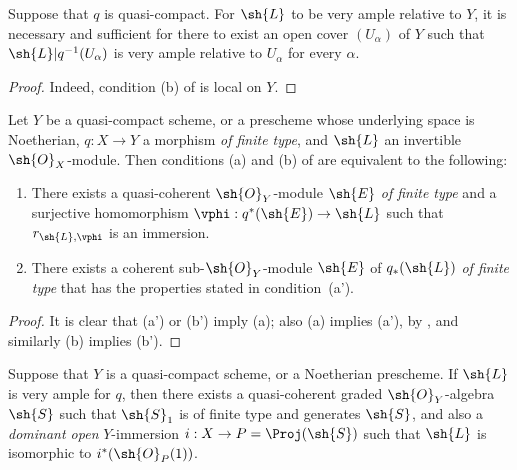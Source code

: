 \begin{corollary}[4.4.5]
\label{II.4.4.5}
Suppose that $q$ is quasi-compact.
For $\sh{L}$ to be very ample relative to $Y$, it is necessary and sufficient for there to exist an open cover $(U_\alpha)$ of $Y$ such that $\sh{L}|q^{-1}(U_\alpha)$ is very ample relative to $U_\alpha$ for every $\alpha$.
\end{corollary}

\begin{proof}
Indeed, condition (b) of  is local on $Y$.
\end{proof}

\begin{proposition}[4.4.6]
\label{II.4.4.6}
Let $Y$ be a quasi-compact scheme, or a prescheme whose underlying space is Noetherian, $q:X\to Y$ a morphism \emph{of finite type}, and $\sh{L}$ an invertible $\sh{O}_X$-module.
Then conditions (a) and (b) of  are equivalent to the following:
\begin{enumerate}
  \item[\rm{(a')}] There exists a quasi-coherent $\sh{O}_Y$-module $\sh{E}$ \emph{of finite type} and a surjective homomorphism $\vphi:q^*(\sh{E})\to\sh{L}$ such that $r_{\sh{L},\vphi}$ is an immersion.
  \item[\rm{(b')}] There exists a coherent sub-$\sh{O}_Y$-module $\sh{E}$ of $q_*(\sh{L})$ \emph{of finite type} that has the properties stated in condition~(a').
\end{enumerate}
\end{proposition}

\begin{proof}
It is clear that (a') or (b') imply (a);
also (a) implies (a'), by , and similarly (b) implies (b').
\end{proof}

\begin{corollary}[4.4.7]
\label{II.4.4.7}
Suppose that $Y$ is a quasi-compact scheme, or a Noetherian prescheme.
If $\sh{L}$ is very ample for $q$, then there exists a quasi-coherent graded $\sh{O}_Y$-algebra $\sh{S}$ such that $\sh{S}_1$ is of finite type and generates $\sh{S}$, and also a \emph{dominant open} $Y$-immersion $i:X\to P=\Proj(\sh{S})$ such that $\sh{L}$ is isomorphic to $i^*(\sh{O}_P(1))$.
\end{corollary}

